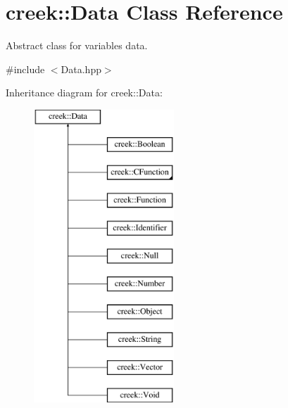 \hypertarget{classcreek_1_1_data}{}\section{creek\+:\+:Data Class Reference}
\label{classcreek_1_1_data}


Abstract class for variables\textquotesingle{} data.  




{\ttfamily \#include $<$Data.\+hpp$>$}

Inheritance diagram for creek\+:\+:Data\+:\begin{figure}[H]
\begin{center}
\leavevmode
\includegraphics[height=11.000000cm]{classcreek_1_1_data}
\end{center}
\end{figure}
